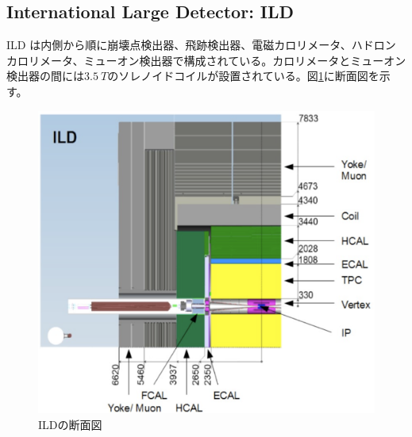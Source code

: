 \subsection{International Large Detector: ILD}
ILD \cite{tdr2}は内側から順に崩壊点検出器、飛跡検出器、電磁カロリメータ、ハドロンカロリメータ、ミューオン検出器で構成されている。カロリメータとミューオン検出器の間には$\SI{3.5}{T}$のソレノイドコイルが設置されている。図\ref{ild}に断面図を示す。
\begin{figure}[H]
	\begin{center}
 \includegraphics[keepaspectratio, scale=0.25]
 	{Figure/Introduction/ild.png}
 		\caption {ILDの断面図}
 		\label{ild}
	\end{center}
\end{figure}

